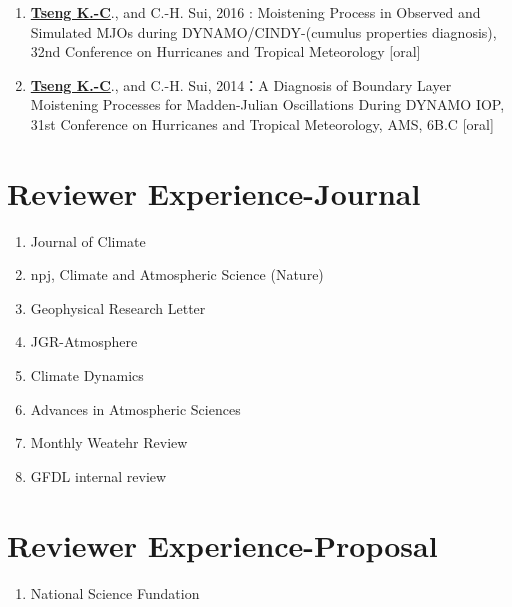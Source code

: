 \documentclass{article}
\begin{document}
\begin{enumerate}
	\item \normalsize{\bf{\underline{Tseng K.-C}}}., and C.-H. Sui, 2016 : Moistening Process in Observed and Simulated MJOs during DYNAMO/CINDY-(cumulus properties diagnosis), 32nd Conference on Hurricanes and Tropical Meteorology [oral] 
	\item \normalsize{\bf{\underline{Tseng K.-C}}}., and C.-H. Sui, 2014：A Diagnosis of Boundary Layer Moistening Processes for Madden-Julian Oscillations During DYNAMO IOP, 31st Conference on Hurricanes and Tropical Meteorology, AMS, 6B.C [oral] 
    \end{enumerate}


\section{\color{airforceblue}Reviewer Experience-Journal}
\begin{enumerate}
	\item Journal of Climate 
	\item npj, Climate and Atmospheric Science (Nature)
	\item Geophysical Research Letter
	\item JGR-Atmosphere
	\item Climate Dynamics
	\item Advances in Atmospheric Sciences
	\item Monthly Weatehr Review
	\item GFDL internal review
\end{enumerate}
\section{\color{airforceblue}Reviewer Experience-Proposal}
\begin{enumerate}
	\item National Science Fundation
\end{enumerate}
\end{document}
